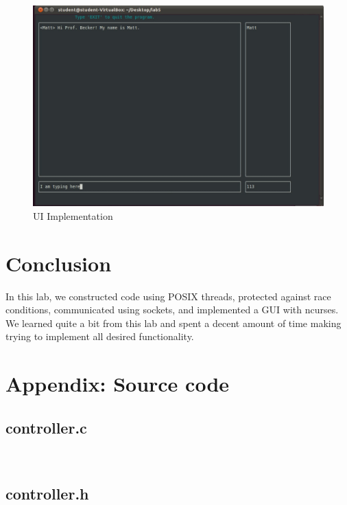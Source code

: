 \documentclass{article}
\begin{document}
\begin{figure}[!h]
\caption{UI Implementation}
\begin{center}
\includegraphics[scale=0.2]{ui.jpg}
\end{center}
\label{UI}
\end{figure}

\section*{Conclusion}
In this lab, we constructed code using POSIX threads, protected against race conditions, communicated using sockets, and implemented a GUI with ncurses. We learned quite a bit from this lab and spent a decent amount of time making trying to implement all desired functionality.

\section*{Appendix: Source code}

\subsection*{controller.c}

\begin{verbatim}


\end{verbatim}

\subsection*{controller.h}

\begin{verbatim}



\end{verbatim}
\end{document}
